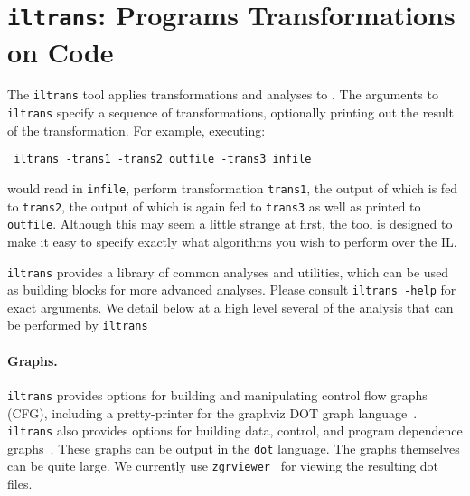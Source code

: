 \section{\texttt{iltrans}: Programs Transformations on \bil Code}
The {\tt iltrans} tool applies transformations and analyses to \bil.
The arguments to {\tt iltrans} specify a sequence of transformations,
optionally printing out the result of the transformation.  For
example, executing:
\begin{verbatim}
 iltrans -trans1 -trans2 outfile -trans3 infile
\end{verbatim}
would read in {\tt infile}, perform transformation {\tt trans1}, the
output of which is fed to {\tt trans2}, the output of which is again
fed to {\tt trans3} as well as printed to {\tt outfile}. Although this
may seem a little strange at first, the tool is designed to make it
easy to specify exactly what algorithms you wish to perform over the
IL.


{\tt iltrans} provides a library of common analyses and utilities,
which can be used as building blocks for more advanced analyses.
Please consult {\tt iltrans -help} for exact arguments.  We detail
below at a high level several of the analysis that can be performed by
{\tt iltrans}




\paragraph{Graphs.} {\tt iltrans} provides options for building and
manipulating control flow graphs (CFG), including a pretty-printer for
the graphviz DOT graph language~\cite{graphviz:dot}. {\tt iltrans}
also provides options for building data, control, and program
dependence graphs~\cite{muchnick:1997}.  These graphs can be output in
the {\tt dot} language.  The graphs themselves can be quite large.  We
currently use {\tt zgrviewer}~\cite{zgrviewer} for viewing the
resulting dot files.


